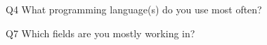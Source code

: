 \begin{description}%
\item{Q4} What programming language(s) do you use most often?%
\item{Q7} Which fields are you mostly working in?%
\end{description}%
